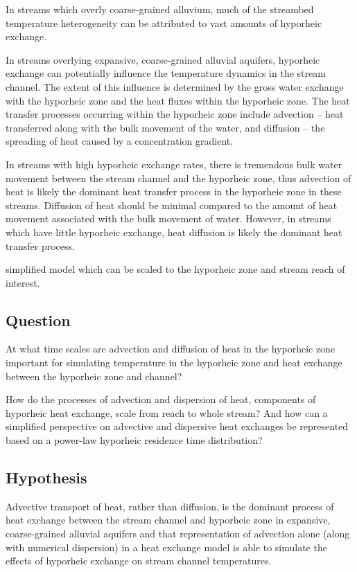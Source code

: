 \documentclass[a4paper]{article}
\begin{document}
In streams which overly coarse-grained alluvium, much of the streambed temperature heterogeneity can be attributed to vast amounts of hyporheic exchange. 


In streams overlying expansive, coarse-grained alluvial aquifers, hyporheic exchange can potentially influence the temperature dynamics in the stream channel. The extent of this influence is determined by the gross water exchange with the hyporheic zone and the heat fluxes within the hyporheic zone. The heat transfer processes occurring within the hyporheic zone include advection -- heat transferred along with the bulk movement of the water,  and diffusion -- the spreading of heat caused by a concentration gradient. 

In streams with high hyporheic exchange rates, there is tremendous bulk water movement between the stream channel and the hyporheic zone, thus advection of heat is likely the dominant heat transfer process in the hyporheic zone in these streams. Diffusion of heat should be minimal compared to the amount of heat movement associated with the bulk movement of water. However, in streams which have little hyporheic exchange, heat diffusion is likely the dominant heat transfer process. 

simplified model which can be scaled to the hyporheic zone and stream reach of interest. 


\subsection*{Question}
At what time scales are advection and diffusion of heat in the hyporheic zone important for simulating temperature in the hyporheic zone and heat exchange between the hyporheic zone and channel?

How do the processes of advection and dispersion of heat, components of hyporheic heat exchange, scale from reach to whole stream? And how can a simplified perspective on advective and dispersive heat exchanges  be represented based on a power-law hyporheic residence time distribution?


\subsection*{Hypothesis}
Advective transport of heat, rather than diffusion, is the dominant process of heat exchange between the stream channel and hyporheic zone in expansive, coarse-grained alluvial aquifers and that representation of advection alone (along with numerical dispersion) in a heat exchange model is able to simulate the effects of hyporheic exchange on stream channel temperatures.
\end{document}
